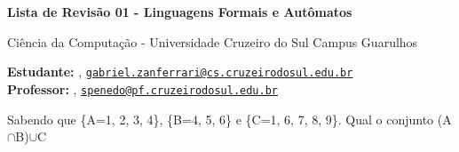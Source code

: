 





\begin{Large}
    \textsf{\textbf{Lista de Revisão 01 - Linguagens Formais e Autômatos}}
    
    Ciência da Computação - Universidade Cruzeiro do Sul Campus Guarulhos
\end{Large}

\vspace{1ex}

\textsf{\textbf{Estudante:}} , \href{mailto:your.email@hotmail.com}{\texttt{gabriel.zanferrari@cs.cruzeirodosul.edu.br}}\\
\textsf{\textbf{Professor:}} , \href{mailto:teacher.email@hotmail.com}{\texttt{spenedo@pf.cruzeirodosul.edu.br}}


\vspace{2ex}

\begin{problem}{}{}
Sabendo que \{A={1, 2, 3, 4}\}, \{B={4, 5, 6}\} e \{C={1, 6, 7, 8, 9}\}. Qual o conjunto (A$\cap$B)$\cup$C
\end{problem}


